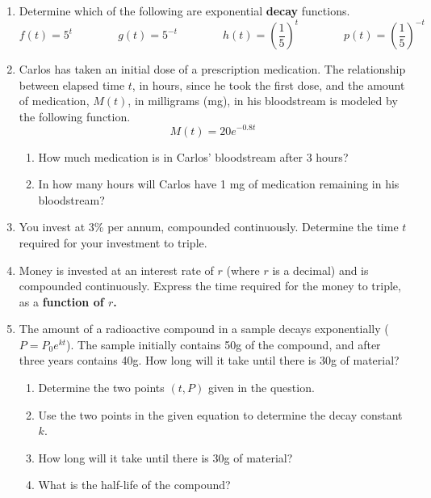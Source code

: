 \begin{enumerate}


\item Determine which of the following are exponential \textbf{decay} functions.
$$f(t)=5^t \quad \quad \quad \quad g(t)=5^{-t}  \quad \quad \quad \quad h(t)=\left(\frac{1}{5}\right)^{t}  \quad \quad \quad \quad p(t)=\left(\frac{1}{5}\right)^{-t}$$



\item Carlos has taken an initial dose of a prescription medication.  The relationship between elapsed time $t$, in hours, since he took the first dose, and the amount of medication, $M(t)$, in milligrams (mg), in his bloodstream is modeled by the following function. $$M(t)=20e^{-0.8t}$$

\begin{enumerate}
\item  How much medication is in Carlos' bloodstream after 3 hours?\vfill
\item In how many hours will Carlos have 1 mg of medication remaining in his bloodstream?\vfill
\vfill
\end{enumerate}

\clearpage

\item You invest at 3\% per annum, compounded continuously.  Determine
  the time $t$ required for your investment to triple.

  \vfill


\item Money is invested at an interest rate of $r$ (where $r$ is a
  decimal) and is compounded continuously.  Express the time required
  for the money to triple, as a \textbf{function of $r$.}

  \vfill

\clearpage
  
\item The amount of a radioactive compound in a sample decays exponentially ($P=P_0e^{kt}$).  The sample initially contains 50g of the compound, and after three years contains 40g.  How long will it take until there is 30g of material?
\begin{enumerate}
\item Determine the two points $(t,P)$ given in the question.\\[.5in]
\item Use the two points in the given equation to determine the decay constant $k$.
\vfill
\item How long will it take until there is 30g of material?
\vfill
\item What is the half-life of the compound?\vfill
\end{enumerate}


\end{enumerate}
